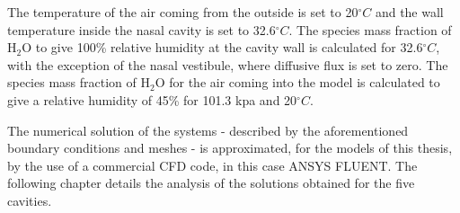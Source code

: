 The temperature of the air coming from the outside is set to 20$^{\circ} C$ and the wall temperature inside the nasal cavity is set to 32.6$^{\circ} C$.  The species mass fraction of $\mathrm{H_2 O}$ to give 100\% relative humidity at the cavity wall is calculated for 32.6$^{\circ} C$, with the exception of the nasal vestibule, where diffusive flux is set to zero. The species mass fraction of $\mathrm{H_2 O}$ for the air coming into the model is calculated to give a relative humidity of 45\% for 101.3 kpa and 20$^{\circ} C$.

The numerical solution of the systems - described by the aforementioned boundary conditions and meshes - is approximated, for the models of this thesis, by the use of a commercial CFD code, in this case ANSYS FLUENT. The following chapter details the analysis of the solutions obtained for the five cavities.
